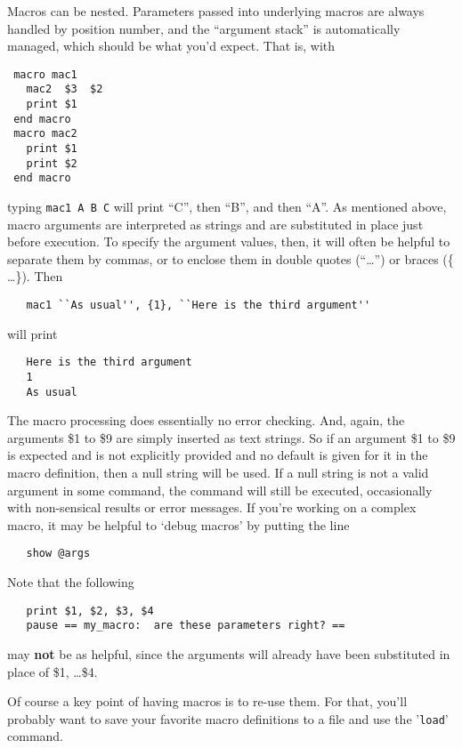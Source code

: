Macros can be nested. Parameters passed into underlying macros are
always handled by position number, and the ``argument stack'' is
automatically managed, which should be what you'd expect.  That is,
with 
\begin{verbatim}
 macro mac1
   mac2  $3  $2
   print $1
 end macro
 macro mac2
   print $1
   print $2
 end macro
\end{verbatim}  %
\noindent   
typing {\texttt{mac1 A B C}} will print ``C'', then ``B'', and then ``A''.
As mentioned above, macro arguments are interpreted as strings and are
substituted in place just before execution.  To specify the argument
values, then, it will often be helpful to separate them by commas, or to
enclose them in double quotes (``\ldots'') or braces (\{ \ldots \}).
Then 
\begin{verbatim}
   mac1 ``As usual'', {1}, ``Here is the third argument''
\end{verbatim}
\noindent will print 
\begin{verbatim}
   Here is the third argument
   1
   As usual
\end{verbatim}

The macro processing does essentially no error checking.  And, again, the
arguments \$1 to \$9 are simply inserted as text strings.  So if an
argument \$1 to \$9 is expected and is not explicitly provided and no
default is given for it in the macro definition, then a null string will be
used.  If a null string is not a valid argument in some command, the
command will still be executed, occasionally with non-sensical results or
error messages.  If you're working on a complex macro, it may be helpful to
`debug macros' by putting the line
\begin{verbatim}
   show @args
\end{verbatim} 
\noindent   
Note that the following
\begin{verbatim}
   print $1, $2, $3, $4
   pause == my_macro:  are these parameters right? ==
\end{verbatim} 
\noindent   
may {\bf{not}} be as helpful, since the arguments will already have been
substituted in place of \$1, \ldots \$4. 

Of course a key point of having macros is to re-use them.  For that, you'll
probably want to save your favorite macro definitions to a file and use the
'{\tt{load}}' command.  



